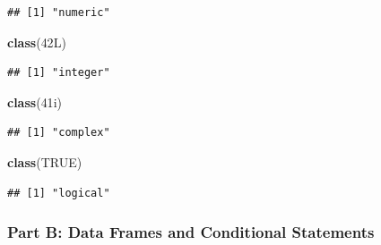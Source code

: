 \documentclass[
]{article}
\newenvironment{Shaded}{\begin{snugshade}}{\end{snugshade}}
\newcommand{\ConstantTok}[1]{\textcolor[rgb]{0.56,0.35,0.01}{#1}}
\newcommand{\DataTypeTok}[1]{\textcolor[rgb]{0.13,0.29,0.53}{#1}}
\newcommand{\DecValTok}[1]{\textcolor[rgb]{0.00,0.00,0.81}{#1}}
\newcommand{\FunctionTok}[1]{\textcolor[rgb]{0.13,0.29,0.53}{\textbf{#1}}}
\newcommand{\NormalTok}[1]{#1}
\begin{document}
\begin{verbatim}
## [1] "numeric"
\end{verbatim}

\begin{Shaded}
\begin{Highlighting}[]
\FunctionTok{class}\NormalTok{(}\DecValTok{42}\DataTypeTok{L}\NormalTok{)}
\end{Highlighting}
\end{Shaded}

\begin{verbatim}
## [1] "integer"
\end{verbatim}

\begin{Shaded}
\begin{Highlighting}[]
\FunctionTok{class}\NormalTok{(}\DecValTok{41}\DataTypeTok{i}\NormalTok{)}
\end{Highlighting}
\end{Shaded}

\begin{verbatim}
## [1] "complex"
\end{verbatim}

\begin{Shaded}
\begin{Highlighting}[]
\FunctionTok{class}\NormalTok{(}\ConstantTok{TRUE}\NormalTok{)}
\end{Highlighting}
\end{Shaded}

\begin{verbatim}
## [1] "logical"
\end{verbatim}

\subsubsection{Part B: Data Frames and Conditional
Statements}\label{part-b-data-frames-and-conditional-statements}
\end{document}
